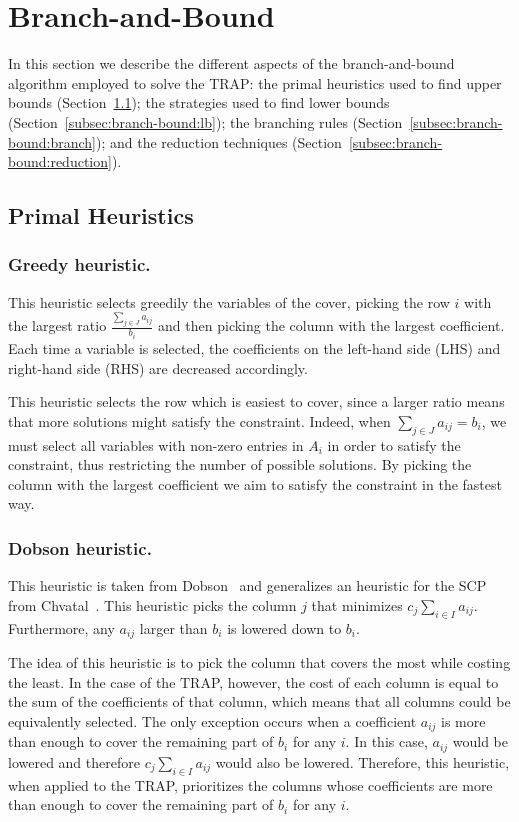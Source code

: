 \documentclass[runningheads]{llncs}
\begin{document}
\section{Branch-and-Bound}
\label{sec:branch-bound}

In this section we describe the different aspects of the branch-and-bound algorithm employed to solve the TRAP: the primal heuristics used to find upper bounds (Section~\ref{subsec:branch-bound:primal}); the strategies used to find lower bounds (Section~\ref{subsec:branch-bound:lb}); the branching rules (Section~\ref{subsec:branch-bound:branch}); and the reduction techniques (Section~\ref{subsec:branch-bound:reduction}). 

\subsection{Primal Heuristics}
\label{subsec:branch-bound:primal}

\subsubsection{Greedy heuristic.} This heuristic selects greedily the variables of the cover, picking the row $i$ with the largest ratio $\frac{\sum_{j \in J} a_{ij}}{b_i}$ and then picking the column with the largest coefficient. Each time a variable is selected, the coefficients on the left-hand side (LHS) and right-hand side (RHS) are decreased accordingly.

This heuristic selects the row which is easiest to cover, since a larger ratio means that more solutions might satisfy the constraint. Indeed, when $\sum_{j \in J} a_{ij} = b_i$, we must select all variables with non-zero entries in $A_i$ in order to satisfy the constraint, thus restricting the number of possible solutions. By picking the column with the largest coefficient we aim to satisfy the constraint in the fastest way.

\subsubsection{Dobson heuristic.} This heuristic is taken from Dobson~\cite{dobson-1982-worst-case} and generalizes an heuristic for the SCP from Chvatal~\cite{chvatal-1979-greedy}. This heuristic picks the column $j$ that minimizes $c_j \sum_{i \in I} a_{ij}$. Furthermore, any $a_{ij}$ larger than $b_i$ is lowered down to $b_i$.

The idea of this heuristic is to pick the column that covers the most while costing the least. In the case of the TRAP, however, the cost of each column is equal to the sum of the coefficients of that column, which means that all columns could be equivalently selected. The only exception occurs when a coefficient $a_{ij}$ is more than enough to cover the remaining part of $b_i$ for any $i$. In this case, $a_{ij}$ would be lowered and therefore $c_j \sum_{i \in I} a_{ij}$ would also be lowered. Therefore, this heuristic, when applied to the TRAP, prioritizes the columns whose coefficients are more than enough to cover the remaining part of $b_i$ for any $i$. 
\end{document}

